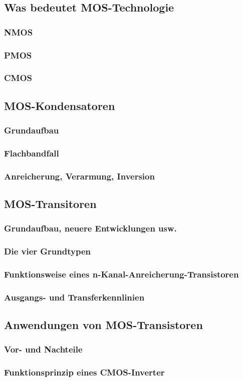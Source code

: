 
\subsection{Was bedeutet MOS-Technologie}
	\subsubsection{NMOS}
	\subsubsection{PMOS}
	\subsubsection{CMOS}
\subsection{MOS-Kondensatoren}
	\subsubsection{Grundaufbau}
	\subsubsection{Flachbandfall}
	\subsubsection{Anreicherung, Verarmung, Inversion}
\subsection{MOS-Transitoren}
	\subsubsection{Grundaufbau, neuere Entwicklungen usw.}
	\subsubsection{Die vier Grundtypen}
	\subsubsection{Funktionsweise eines n-Kanal-Anreicherung-Transistoren}
	\subsubsection{Ausgangs- und Transferkennlinien}
\subsection{Anwendungen von MOS-Transistoren}
	\subsubsection{Vor- und Nachteile}
	\subsubsection{Funktionsprinzip eines CMOS-Inverter}



